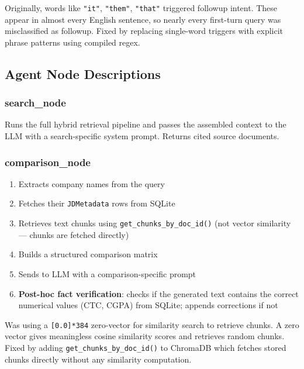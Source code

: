 \documentclass[12pt, a4paper]{article}
\begin{document}
\begin{bugbox}
Originally, words like \texttt{"it"}, \texttt{"them"}, \texttt{"that"} triggered followup intent. These appear in almost every English sentence, so nearly every first-turn query was misclassified as followup. Fixed by replacing single-word triggers with explicit phrase patterns using compiled regex.
\end{bugbox}

\subsection{Agent Node Descriptions}

\subsubsection{search\_node}
Runs the full hybrid retrieval pipeline and passes the assembled context to the LLM with a search-specific system prompt. Returns cited source documents.

\subsubsection{comparison\_node}
\begin{enumerate}[noitemsep]
    \item Extracts company names from the query
    \item Fetches their \texttt{JDMetadata} rows from SQLite
    \item Retrieves text chunks using \texttt{get\_chunks\_by\_doc\_id()} (not vector similarity --- chunks are fetched directly)
    \item Builds a structured comparison matrix
    \item Sends to LLM with a comparison-specific prompt
    \item \textbf{Post-hoc fact verification}: checks if the generated text contains the correct numerical values (CTC, CGPA) from SQLite; appends corrections if not
\end{enumerate}

\begin{bugbox}
Was using a \texttt{[0.0]*384} zero-vector for similarity search to retrieve chunks. A zero vector gives meaningless cosine similarity scores and retrieves random chunks. Fixed by adding \texttt{get\_chunks\_by\_doc\_id()} to ChromaDB which fetches stored chunks directly without any similarity computation.
\end{bugbox}
\end{document}
